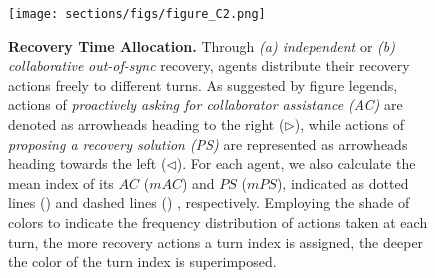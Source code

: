 \begin{figure}[H]
\begin{center}
\begin{small}
    \texttt{[image: sections/figs/figure\_C2.png]}
    \caption{\textbf{Recovery Time Allocation.} Through \textit{(a) independent} or \textit{(b) collaborative} \textit{out-of-sync} recovery, agents distribute their recovery actions freely to different turns.
    As suggested by figure legends, actions of \textcolor{fig2_ask}{\textit{proactively asking for collaborator assistance (AC)}} are denoted as arrowheads heading to the right ($\triangleright$), while actions of \textcolor{fig2_code}{\textit{proposing a recovery solution (PS)}} are represented as arrowheads heading towards the left ($\triangleleft$).
    For each agent, we also calculate the mean index of its $AC$ ($mAC$) and $PS$ ($mPS$), indicated as dotted lines
    (\protect{})
    and dashed lines
    (\protect{})
    , respectively.
    Employing the shade of colors to indicate the frequency distribution of actions taken at each turn, the more recovery actions a turn index is assigned, the deeper the color of the turn index is superimposed. }
    \label{fig:figure C2 (recovery time allocation)}
\vspace{0em}
\end{small}
\end{center}
\end{figure}



